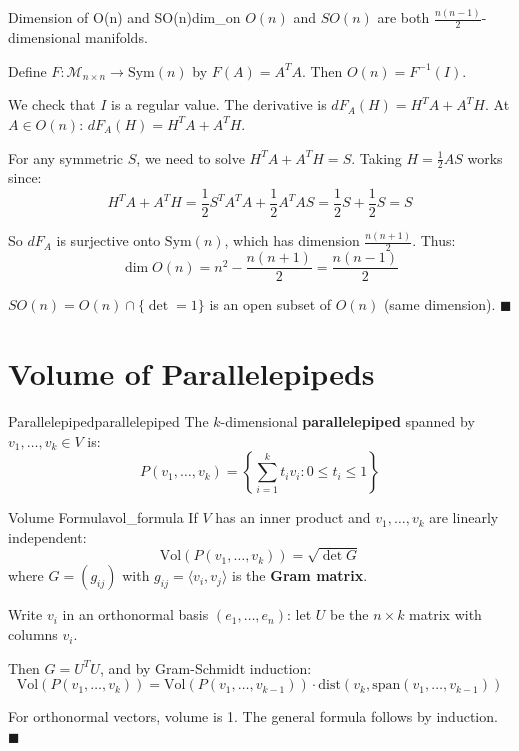 \documentclass[11pt, letterpaper, openany]{book}
\renewenvironment{proof}[1][\proofname]{%
  \tcolorbox[blanker, breakable, left=1em,
    before skip=1em, after skip=1em,
    borderline west={2pt}{0pt}{MagicTeal!50},
    colback=MagicCream,
    before upper={\textcolor{MagicTeal}{\sffamily\bfseries #1.}\space}
  ]%
}{%
  \hfill\textcolor{MagicTeal}{\ensuremath{\blacksquare}}\endtcolorbox%
}
\begin{document}
\begin{thm}{Dimension of O(n) and SO(n)}{dim_on}
$O(n)$ and $SO(n)$ are both $\frac{n(n-1)}{2}$-dimensional manifolds.
\end{thm}

\begin{proof}
Define $F: \mathcal{M}_{n \times n} \to \text{Sym}(n)$ by $F(A) = A^T A$. Then $O(n) = F^{-1}(I)$.

We check that $I$ is a regular value. The derivative is $dF_A(H) = H^T A + A^T H$. At $A \in O(n)$: $dF_A(H) = H^T A + A^T H$.

For any symmetric $S$, we need to solve $H^T A + A^T H = S$. Taking $H = \frac{1}{2}AS$ works since:
\[H^T A + A^T H = \frac{1}{2}S^T A^T A + \frac{1}{2}A^T A S = \frac{1}{2}S + \frac{1}{2}S = S\]

So $dF_A$ is surjective onto $\text{Sym}(n)$, which has dimension $\frac{n(n+1)}{2}$. Thus:
\[\dim O(n) = n^2 - \frac{n(n+1)}{2} = \frac{n(n-1)}{2}\]

$SO(n) = O(n) \cap \{\det = 1\}$ is an open subset of $O(n)$ (same dimension).
\end{proof}

\section{Volume of Parallelepipeds}

\begin{defn}{Parallelepiped}{parallelepiped}
The $k$-dimensional \textbf{parallelepiped} spanned by $v_1, \ldots, v_k \in V$ is:
\[P(v_1, \ldots, v_k) = \left\{\sum_{i=1}^k t_i v_i : 0 \leq t_i \leq 1\right\}\]
\end{defn}

\begin{thm}{Volume Formula}{vol_formula}
If $V$ has an inner product and $v_1, \ldots, v_k$ are linearly independent:
\[\text{Vol}(P(v_1, \ldots, v_k)) = \sqrt{\det G}\]
where $G = (g_{ij})$ with $g_{ij} = \langle v_i, v_j \rangle$ is the \textbf{Gram matrix}.
\end{thm}

\begin{proof}
Write $v_i$ in an orthonormal basis $(e_1, \ldots, e_n)$: let $U$ be the $n \times k$ matrix with columns $v_i$.

Then $G = U^T U$, and by Gram-Schmidt induction:
\[\text{Vol}(P(v_1, \ldots, v_k)) = \text{Vol}(P(v_1, \ldots, v_{k-1})) \cdot \text{dist}(v_k, \text{span}(v_1, \ldots, v_{k-1}))\]

For orthonormal vectors, volume is 1. The general formula follows by induction.
\end{proof}
\end{document}
